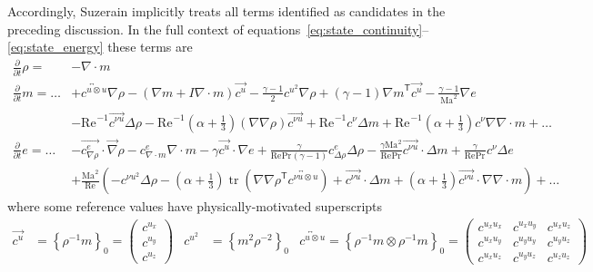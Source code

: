 \documentclass[letterpaper,11pt,nointlimits,reqno,draft]{amsbook}
\newcommand{\trans}[1]{{#1}^{\ensuremath{\mathsf{T}}}}
\newcommand{\Mach}[1][]{\ensuremath{\mbox{Ma}_{#1}}}
\newcommand{\Reynolds}[1][]{\ensuremath{\mbox{Re}_{#1}}}
\newcommand{\Prandtl}[1][]{\ensuremath{\mbox{Pr}_{#1}}}
\newcommand{\reference}[1]{\ensuremath{\left\{#1\right\}_{0}}}
\DeclareMathOperator{\trace}{tr}
\begin{document}
Accordingly, Suzerain implicitly treats all terms identified as candidates
in the preceding discussion.  In the full context of
equations~\eqref{eq:state_continuity}--\eqref{eq:state_energy} these terms are
\begin{align}
  \frac{\partial}{\partial{}t} \rho{} = &-\nabla\cdot{}m
\\
  \frac{\partial}{\partial{}t} m = \dots
   &+ \overleftrightarrow{c^{u\otimes{}u}} \nabla\rho
    - \left(\nabla{}m+I\nabla\cdot{}m\right)\overrightarrow{c^u}
    - \frac{\gamma-1}{2} c^{u^2} \nabla\rho
    + \left(\gamma-1\right)\trans{\nabla{}m} \overrightarrow{c^u}
    - \frac{\gamma-1}{\Mach^2}\nabla{}e
\\
   &- \Reynolds^{-1} \overrightarrow{c^{\nu{}u}} \Delta\rho
    - \Reynolds^{-1} \left(\alpha+\frac{1}{3}\right) \left(\nabla\nabla\rho\right) \overrightarrow{c^{\nu{}u}}
    + \Reynolds^{-1} c^{\nu} \Delta{}m
    + \Reynolds^{-1} \left(\alpha+\frac{1}{3}\right)c^{\nu} \nabla\nabla\cdot{}m
    + \dots
\\
  \frac{\partial}{\partial{}t} e = \dots
   &- \overrightarrow{c^{e}_{\nabla\rho}} \cdot\vec{\nabla}\rho
    - c^{e}_{\nabla\cdot{}m} \nabla\cdot{}m
    - \gamma \overrightarrow{c^u}\cdot\nabla{}e
    + \frac{\gamma}{\Reynolds\Prandtl\left(\gamma-1\right)}
      c^{e}_{\Delta\rho} \Delta\rho
    - \frac{\gamma\Mach^{2}}{\Reynolds\Prandtl}
      \overrightarrow{c^{\nu{}u}}\cdot\Delta{}m
    + \frac{\gamma}{\Reynolds\Prandtl}c^{\nu}\Delta{}e
\\
   &+ \frac{\Mach^2}{\Reynolds}\left(
       - c^{\nu{}u^2}\Delta\rho
       - \left(\alpha+\frac{1}{3}\right)
         \trace\left(\trans{\nabla\nabla\rho}
                     \overleftrightarrow{c^{\nu{}u\otimes{}u}}\right)
       + \overrightarrow{c^{\nu{}u}}\cdot\Delta{}m
       + \left(\alpha+\frac{1}{3}\right)
         \overrightarrow{c^{\nu{}u}}\cdot\nabla\nabla\cdot{}m
   \right)
       + \dots
\end{align}
where some reference values have physically-motivated superscripts
\begin{align}
  \overrightarrow{c^{u}} &= \reference{\rho^{-1}m}
  = \begin{pmatrix} c^{u_x} \\ c^{u_y} \\ c^{u_z} \end{pmatrix}
&
  c^{u^2} &= \reference{m^{2}\rho^{-2}}
&
   \overleftrightarrow{c^{u\otimes{}u}}
  = \reference{\rho^{-1}m\otimes\rho^{-1}m}
  = \begin{pmatrix}
   c^{u_x u_x} & c^{u_x u_y} & c^{u_x u_z} \\
   c^{u_x u_y} & c^{u_y u_y} & c^{u_y u_z} \\
   c^{u_x u_z} & c^{u_y u_z} & c^{u_z u_z}
  \end{pmatrix}
\end{align}
\end{document}
